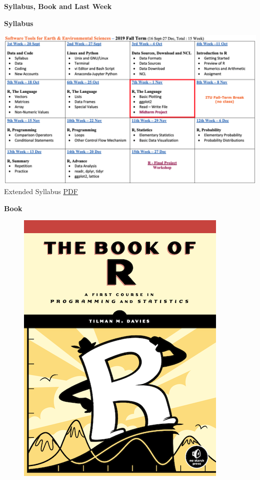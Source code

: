 \documentclass[ignorenonframetext,]{beamer}
\begin{document}
\begin{frame}{\textbf{Syllabus, Book and Last Week}}

\begin{block}{\textbf{Syllabus}}

\includegraphics{syllabus.png} Extended Syllabus
\href{https://web.itu.edu.tr/~tokerem/Software_Tools_Syllabus.pdf}{PDF}

\end{block}

\begin{block}{\textbf{Book}}

\begin{figure}
\centering
\includegraphics{The_Book_of_R.png}
\caption{}
\end{figure}


\end{block}
\end{frame}
\end{document}
